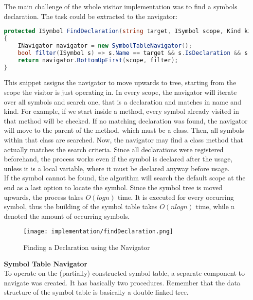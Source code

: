 The main challenge of the whole visitor implementation was to find a symbols declaration.
The task could be extracted to the navigator:

\begin{lstlisting}[language=csharp, caption={Finding a Declaration}, captionpos=b, label={lst:visitorfinddecl}]
protected ISymbol FindDeclaration(string target, ISymbol scope, Kind kind)
{
    INavigator navigator = new SymbolTableNavigator();
    bool filter(ISymbol s) => s.Name == target && s.IsDeclaration && s.Kind == kind;
    return navigator.BottomUpFirst(scope, filter);
}
\end{lstlisting}

This snippet assigns the navigator to move upwards to tree, starting from the scope the visitor is just operating in.
In every scope, the navigator will iterate over all symbols and search one, that is a declaration and matches in name and kind.
For example, if we start inside a method, every symbol already visited in that method will be checked.
If no matching declaration was found, the navigator will move to the parent of the method, which must be a class.
Then, all symbols within that class are searched.
Now, the navigator may find a class method that actually matches the search criteria.
Since all declarations were registered beforehand, the process works even if the symbol is declared after the usage, unless it is a local variable, where it must be declared anyway before usage.\\

If the symbol cannot be found, the algorithm will search the default scope at the end as a last option to locate the symbol.
Since the symbol tree is moved upwards, the process takes $O(logn)$ time.
It is executed for every occurring symbol, thus the building of the symbol table takes $O(nlogn)$ time, while n denoted the amount of occurring symbols.\\

\begin{figure}[h]
    \centering
    \texttt{[image: implementation/findDeclaration.png]}
    \caption{Finding a Declaration using the Navigator}
    \label{fig:findDecl}
\end{figure}


\textbf{Symbol Table Navigator}\\
To operate on the (partially) constructed symbol table, a separate component to navigate was created.
It has basically two procedures.
Remember that the data structure of the symbol table is basically a double linked tree.

